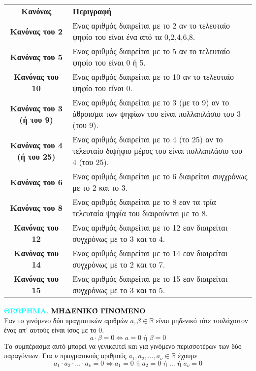 \documentclass[twoside,10pt]{book}
\newcounter{thewrhma}[chapter]
\renewcommand{\thethewrhma}{\thechapter.\arabic{thewrhma}}
\newcommand{\Thewrhma}[1]{\refstepcounter{thewrhma}\textcolor{cyan}{\textbf{ΘΕΩΡΗΜΑ\hspace{2mm}\thethewrhma\hspace{1mm} \textcolor{black}{\MakeUppercase{#1}}}}\\}{}
\begin{document}
\begin{center}
\begin{longtable}{c>{\centering\arraybackslash}m{8.3cm}}
\hline \rule[-2ex]{0pt}{5.5ex} \textbf{Κανόνας} & \textbf{Περιγραφή}  \\ 
\hhline{==} \rule[-2ex]{0pt}{7ex} \textbf{Κανόνας του 2} & Ένας αριθμός διαιρείται με το 2 αν το τελευταίο ψηφίο του είναι ένα από τα 0,2,4,6,8. \\
\rule[-2ex]{0pt}{5.5ex} \textbf{Κανόνας του 5} & Ένας αριθμός διαιρείται με το 5 αν το τελευταίο ψηφίο του είναι 0 ή 5. \\
\rule[-2ex]{0pt}{5.5ex} \textbf{Κανόνας του 10} & Ένας αριθμός διαιρείται με το 10 αν το τελευταίο ψηφίο του είναι 0. \\
\rule[-2ex]{0pt}{5.5ex} \textbf{Κανόνας του 3 (ή του 9)} & Ένας αριθμός διαιρείται με το 3 (με το 9) αν το άθροισμα των ψηφίων του είναι πολλαπλάσιο του 3 (του 9). \\
\rule[-2ex]{0pt}{5.5ex} \textbf{Κανόνας του 4 (ή του 25)} & Ένας αριθμός διαιρείται με το 4 (το 25) αν το τελευταίο διψήφιο μέρος του είναι πολλαπλάσιο του 4 (του 25). \\
\rule[-2ex]{0pt}{5.5ex} \textbf{Κανόνας του 6} & Ένας αριθμός διαιρείται με το 6 διαιρείται συγχρόνως με το 2 και το 3.\\
\rule[-2ex]{0pt}{5.5ex} \textbf{Κανόνας του 8} & Ένας αριθμός διαιρείται με το 8 εαν τα τρία τελευταία ψηφία του διαιρούνται με το 8.\\
\rule[-2ex]{0pt}{5.5ex} \textbf{Κανόνας του 12} & Ένας αριθμός διαιρείται με το 12 εαν διαιρείται συγχρόνως με το 3 και το 4.\\
\rule[-2ex]{0pt}{5.5ex} \textbf{Κανόνας του 14} & Ένας αριθμός διαιρείται με το 14 εαν διαιρείται συγχρόνως με το 2 και το 7.\\
\rule[-2ex]{0pt}{5.5ex} \textbf{Κανόνας του 15} & Ένας αριθμός διαιρείται με το 15 εαν διαιρείται συγχρόνως με το 3 και το 5.\\
\hline
\end{longtable}
\end{center}
\Thewrhma{μηδενικό γινόμενο}
Εαν το γινόμενο δύο πραγματικών αριθμών $ a,\beta\in\mathbb{R} $ είναι μηδενικό τότε τουλάχιστον ένας απ’ αυτούς είναι ίσος με το $ 0 $.
\[ a\cdot\beta=0\Leftrightarrow a=0\textrm{ ή }\beta=0 \]
Το συμπέρασμα αυτό μπορεί να γενικευτεί και για γινόμενο περισσοτέρων των δύο παραγόντων. Για $ \nu $ πραγματικούς αριθμούς $ a_1,a_2,\ldots,a_\nu\in\mathbb{R} $ έχουμε
\[ a_1\cdot a_2\cdot\ldots\cdot a_\nu=0\Leftrightarrow a_1=0\textrm{ ή }a_2=0\textrm{ ή }\ldots\textrm{ ή }a_\nu=0 \]
\end{document}
